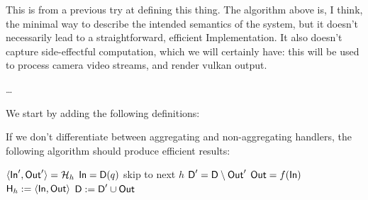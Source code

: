 \documentclass{article}
\begin{document}
This is from a previous try at defining this thing. The algorithm above is, I
think, the minimal way to describe the intended semantics of the system, but it
doesn't necessarily lead to a straightforward, efficient Implementation. It also
doesn't capture side-effectful computation, which we will certainly have: this will
be used to process camera video streams, and render vulkan output.

\dots

We start by adding the following definitions:


If we don't differentiate between aggregating and non-aggregating handlers, the
following algorithm should produce efficient results:

\begin{algorithm}
\caption{Reactor Tick}

\begin{algorithmic}
  \STATE $\langle \textsf{In}', \textsf{Out}' \rangle = \mathcal{H}_{h}$
  \STATE $\textsf{In} = \textsf{D}(q)$
   \STATE skip to next $h$ \ENDIF
  \STATE $\textsf{D}' = \textsf{D} \setminus \textsf{Out}'$
  \STATE $\textsf{Out} = f(\textsf{In})$
  \STATE $\textsf{H}_{h} := \langle \textsf{In}, \textsf{Out} \rangle$
  \STATE $\textsf{D} := \textsf{D}' \cup \textsf{Out}$
  \ENDFOR
\end{algorithmic}

\end{algorithm}
\end{document}
